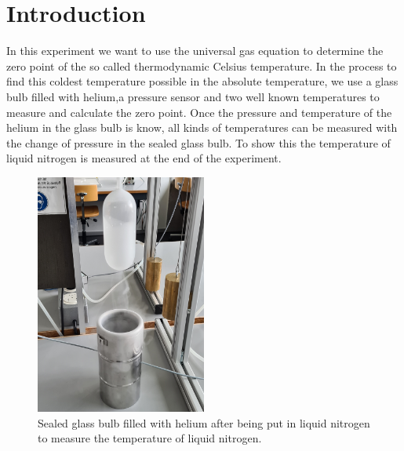 \section{Introduction}

In this experiment we want to use the universal gas equation to determine the zero point of the so called thermodynamic Celsius temperature. 
In the process to find this coldest temperature possible in the absolute temperature, we use a glass bulb filled with helium,a pressure sensor and two well known temperatures to measure and calculate the zero point. 
Once the pressure and temperature of the helium in the glass bulb is know, all kinds of temperatures can be measured with the change of pressure in the sealed glass bulb.
To show this the temperature of liquid nitrogen is measured at the end of the experiment.
\begin{figure}[h]
	\centering
	\includegraphics[width=0.5\textwidth]{sections/images/liquid.jpg}
	\caption{Sealed glass bulb filled with helium after being put in liquid nitrogen to measure the temperature of liquid nitrogen.}
\end{figure}
